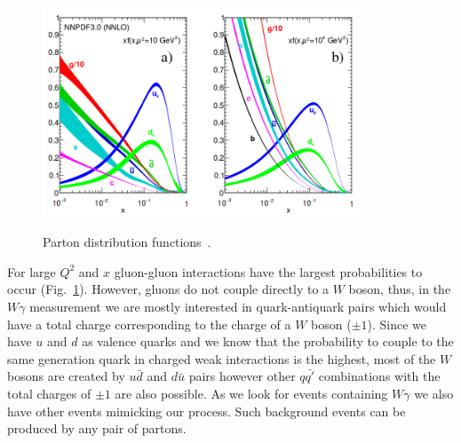 \begin{figure}[htb]
  \begin{center}
    {\includegraphics[width=0.85\textwidth]{../figs/Intro/pdfs.png}}
    \caption{Parton distribution functions~\cite{ref_PDG}.}
    \label{fig:pdfs}
  \end{center}
\end{figure}

For large $Q^2$ and $x$ gluon-gluon interactions have the largest probabilities to occur (Fig.~\ref{fig:pdfs}). However, gluons do not couple directly to a $W$ boson, thus, in the $W\gamma$ measurement we are mostly interested in quark-antiquark pairs which would have a total charge corresponding to the charge of a $W$ boson ($\pm 1$). Since we have $u$ and $d$ as valence quarks and we know that the probability to couple to the same generation quark in charged weak interactions is the highest, most of the $W$ bosons are created by $u\bar{d}$ and $d\bar{u}$ pairs however other $q\bar{q'}$ combinations with the total charges of $\pm 1$ are also possible. As we look for events containing $W\gamma$ we also have other events mimicking our process. Such background events can be produced by any pair of partons.\\



